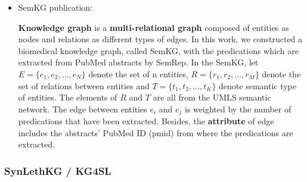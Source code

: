 \documentclass{article}
\begin{document}
\begin{itemize}

\item SemKG publication:
\begin{displayquote}
\textbf{Knowledge graph} is a \textbf{multi-relational graph} composed of entities as nodes and relations as different types of edges. In this work, we constructed a biomedical knowledge graph, called SemKG, with the predications which are extracted from PubMed abstracts by SemRep. In the SemKG, let $ E = \{ e_1, e_2, \ldots, e_N \} $ denote the set of n entities, $ R = \{ r_1, r_2, \ldots, r_M \} $ denote the set of relations between entities and $ T = \{ t_1, t_2, \ldots, t_K \} $ denote semantic type of entities. The elements of $ R $ and $ T $ are all from the UMLS semantic network. The edge between entities $ e_i $ and $ e_j $ is weighted by the number of predications that have been extracted. Besides, the \textbf{attribute} of edge includes the abstracts’ PubMed ID (pmid) from where the predications are extracted.
\end{displayquote}

\end{itemize}


\subsubsection{SynLethKG / KG4SL}
\end{document}
